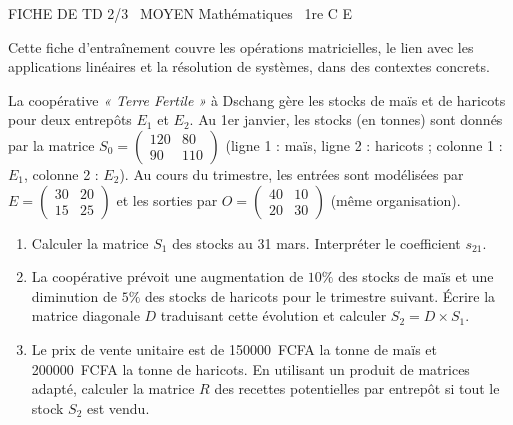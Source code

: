 \documentclass[11pt]{article}
\begin{document}
\begin{tcolorbox}[enhanced,colback=popink,colframe=popink,arc=10pt,boxrule=0pt,left=12pt,right=12pt,top=9pt,bottom=9pt]
{\color{white}\popxbold\small FICHE DE TD 2/3 \textbullet\ MOYEN \hfill Mathématiques \textbullet\ 1re C E\par}
\end{tcolorbox}
\vspace{4pt}
\noindent Cette fiche d'entraînement couvre les opérations matricielles, le lien avec les applications linéaires et la résolution de systèmes, dans des contextes concrets.

\begin{exercice}
La coopérative \textit{« Terre Fertile »} à Dschang gère les stocks de maïs et de haricots pour deux entrepôts $E_1$ et $E_2$. 
Au 1er janvier, les stocks (en tonnes) sont donnés par la matrice $S_0 = \begin{pmatrix} 120 & 80 \\ 90 & 110 \end{pmatrix}$ (ligne 1 : maïs, ligne 2 : haricots ; colonne 1 : $E_1$, colonne 2 : $E_2$).
Au cours du trimestre, les entrées sont modélisées par $E = \begin{pmatrix} 30 & 20 \\ 15 & 25 \end{pmatrix}$ et les sorties par $O = \begin{pmatrix} 40 & 10 \\ 20 & 30 \end{pmatrix}$ (même organisation).
\begin{enumerate}
    \item Calculer la matrice $S_1$ des stocks au 31 mars. Interpréter le coefficient $s_{21}$.
    \item La coopérative prévoit une augmentation de $10\%$ des stocks de maïs et une diminution de $5\%$ des stocks de haricots pour le trimestre suivant. Écrire la matrice diagonale $D$ traduisant cette évolution et calculer $S_2 = D \times S_1$.
    \item Le prix de vente unitaire est de \SI{150000}{FCFA} la tonne de maïs et \SI{200000}{FCFA} la tonne de haricots. 
    En utilisant un produit de matrices adapté, calculer la matrice $R$ des recettes potentielles par entrepôt si tout le stock $S_2$ est vendu.
\end{enumerate}
\end{exercice}
\end{document}
